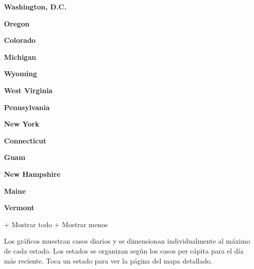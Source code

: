 \textbf{Washington, D.C.}

\href{https://www.nytimes.com/interactive/2020/us/oregon-coronavirus-cases.html}{}

\textbf{Oregon}

\href{https://www.nytimes.com/interactive/2020/us/colorado-coronavirus-cases.html}{}

\textbf{Colorado}

\href{https://www.nytimes.com/interactive/2020/us/michigan-coronavirus-cases.html}{}

\textbf{Michigan}

\href{https://www.nytimes.com/interactive/2020/us/wyoming-coronavirus-cases.html}{}

\textbf{Wyoming}

\href{https://www.nytimes.com/interactive/2020/us/west-virginia-coronavirus-cases.html}{}

\textbf{West Virginia}

\href{https://www.nytimes.com/interactive/2020/us/pennsylvania-coronavirus-cases.html}{}

\textbf{Pennsylvania}

\href{https://www.nytimes.com/interactive/2020/us/new-york-coronavirus-cases.html}{}

\textbf{New York}

\href{https://www.nytimes.com/interactive/2020/us/connecticut-coronavirus-cases.html}{}

\textbf{Connecticut}

\textbf{Guam}

\href{https://www.nytimes.com/interactive/2020/us/new-hampshire-coronavirus-cases.html}{}

\textbf{New Hampshire}

\href{https://www.nytimes.com/interactive/2020/us/maine-coronavirus-cases.html}{}

\textbf{Maine}

\href{https://www.nytimes.com/interactive/2020/us/vermont-coronavirus-cases.html}{}

\textbf{Vermont}

+ Mostrar todo + Mostrar menos

Los gráficos muestran casos diarios y se dimensionan individualmente al
máximo de cada estado. Los estados se organizan según los casos per
cápita para el día más reciente. Toca un estado para ver la página del
mapa detallado.

\href{https://www.nytimes.com/interactive/2020/us/louisiana-coronavirus-cases.html}{}

